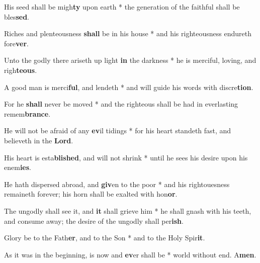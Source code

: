 \begin{multicols}{2}
	His seed shall be migh\textbf{ty} upon earth * the generation of the faithful shall be bles\textbf{sed}.
	
	Riches and plenteousness \textbf{shall} be in his house * and his righteousness endureth fore\textbf{ver}.
	
	Unto the godly there ariseth up light \textbf{in} the darkness * he is merciful, loving, and righ\textbf{teous}.
	
	A good man is merci\textbf{ful}, and lendeth * and will guide his words with discre\textbf{tion}.
	
	For he \textbf{shall} never be moved * and the righteous shall be had in everlasting remem\textbf{brance}.
	
	He will not be afraid of any \textbf{ev}il tidings * for his heart standeth fast, and believeth in the \textbf{Lord}.
	
	His heart is esta\textbf{blished}, and will not shrink * until he sees his desire upon his enem\textbf{ies}.
	
	He hath dispersed abroad, and \textbf{giv}en to the poor * and his rightouesness remaineth forever; his horn shall be exalted with hon\textbf{or}.
	
	The ungodly shall see it, and \textbf{it} shall grieve him * he shall gnash with his teeth, and consume away; the desire of the ungodly shall per\textbf{ish}.
	
	Glory be to the Fath\textbf{er}, and to the Son * and to the Holy Spir\textbf{it}.
	
	As it was in the beginning, is now and \textbf{ev}er shall be * world without end. A\textbf{men}.
\end{multicols}